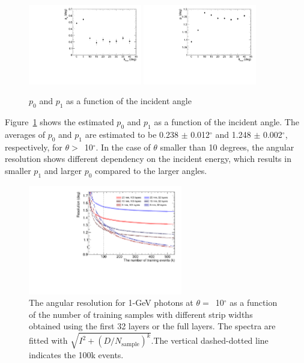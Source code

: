 \documentclass[12pt,times,draftclsnofoot,a4paper]{elsarticle}
\begin{document}
\begin{figure}[!hbt]
\centering
\includegraphics[width=0.44\textwidth]{Fig7_p0.pdf}
\includegraphics[width=0.44\textwidth]{Fig7_p1.pdf}
\caption{ $p_{0}$ and $p_{1}$ as a function of the incident angle }
\label{fig:res_edep}
\end{figure}

Figure~\ref{fig:res_edep} shows the estimated $p_{0}$ and $p_{1}$ as a function of the incident angle. The averages of $p_{0}$ and $p_{1}$ are estimated to be 0.238 $\pm$ 0.012$^{\circ}$ and 1.248 $\pm$ 0.002$^{\circ}$, respectively, for $\theta>$~10$^{\circ}$. In the case of $\theta$ smaller than 10 degrees, the angular resolution shows different dependency on the incident energy, which results in smaller $p_{1}$ and larger $p_{0}$ compared to the larger angles.

\begin{figure}[!hbt]
\centering
\includegraphics[width=0.6\textwidth]{Fig8_nsample_400k_500k.pdf}
\caption{ The angular resolution for 1-GeV photons at $\theta=$~10$^{\circ}$ as a function of the number of training samples with different strip widths obtained using the first 32 layers or the full layers. The spectra are fitted with $\sqrt{I^{2} + (D/N_{\mathrm{sample}})^{k}}$.The vertical dashed-dotted line indicates the 100k events.}
\label{fig:multi-parameter}
\end{figure}
\end{document}

